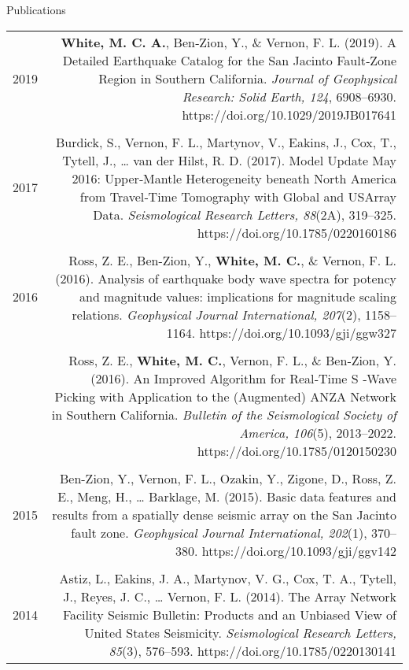 \begin{rSection}{Publications}
	\begin{tabular}{L!{\VRule}R}
		
		2019 & \textbf{White, M. C. A.}, Ben‐Zion, Y., \& Vernon, F. L. (2019). A Detailed Earthquake Catalog for the San Jacinto Fault‐Zone Region in Southern California. \textit{Journal of Geophysical Research: Solid Earth, 124}, 6908–6930. https://doi.org/10.1029/2019JB017641 \\ \\
		
		2017 & Burdick, S., Vernon, F. L., Martynov, V., Eakins, J., Cox, T., Tytell, J., … van der Hilst, R. D. (2017). Model Update May 2016: Upper‐Mantle Heterogeneity beneath North America from Travel‐Time Tomography with Global and USArray Data. \textit{Seismological Research Letters, 88}(2A), 319–325. https://doi.org/10.1785/0220160186 \\ \\
		
		2016 & Ross, Z. E., Ben-Zion, Y., \textbf{White, M. C.}, \& Vernon, F. L. (2016). Analysis of earthquake body wave spectra for potency and magnitude values: implications for magnitude scaling relations. \textit{Geophysical Journal International, 207}(2), 1158–1164. https://doi.org/10.1093/gji/ggw327 \\ \\
		
		& Ross, Z. E., \textbf{White, M. C.}, Vernon, F. L., \& Ben‐Zion, Y. (2016). An Improved Algorithm for Real‐Time S ‐Wave Picking with Application to the (Augmented) ANZA Network in Southern California. \textit{Bulletin of the Seismological Society of America, 106}(5), 2013–2022. https://doi.org/10.1785/0120150230 \\ \\
		
		2015 & Ben-Zion, Y., Vernon, F. L., Ozakin, Y., Zigone, D., Ross, Z. E., Meng, H., … Barklage, M. (2015). Basic data features and results from a spatially dense seismic array on the San Jacinto fault zone. \textit{Geophysical Journal International, 202}(1), 370–380. https://doi.org/10.1093/gji/ggv142 \\ \\         
		
		2014 & Astiz, L., Eakins, J. A., Martynov, V. G., Cox, T. A., Tytell, J., Reyes, J. C., … Vernon, F. L. (2014). The Array Network Facility Seismic Bulletin: Products and an Unbiased View of United States Seismicity. \textit{Seismological Research Letters, 85}(3), 576–593. https://doi.org/10.1785/0220130141
		
	\end{tabular}
\end{rSection}